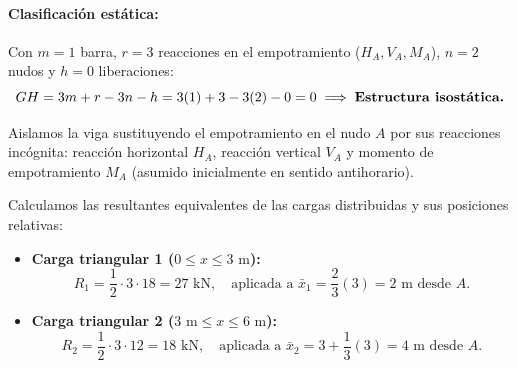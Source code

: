 \paragraph{Clasificación estática:}
Con $m = 1$ barra, $r = 3$ reacciones en el empotramiento ($H_A, V_A, M_A$), $n = 2$ nudos y $h = 0$ liberaciones:
\begin{equation}
    GH = 3m + r - 3n - h = 3(1) + 3 - 3(2) - 0 = 0 \implies \text{\textbf{Estructura isostática.}}
\end{equation}


Aislamos la viga sustituyendo el empotramiento en el nudo $A$ por sus reacciones incógnita: reacción horizontal $H_A$, reacción vertical $V_A$ y momento de empotramiento $M_A$ (asumido inicialmente en sentido antihorario).

Calculamos las resultantes equivalentes de las cargas distribuidas y sus posiciones relativas:
\begin{itemize}
    \item \textbf{Carga triangular 1 ($0 \le x \le 3\text{ m}$):}
          \begin{equation}
              R_1 = \frac{1}{2} \cdot 3 \cdot 18 = 27\text{ kN}, \quad \text{aplicada a } \bar{x}_1 = \frac{2}{3}(3) = 2\text{ m desde } A.
          \end{equation}
    \item \textbf{Carga triangular 2 ($3\text{ m} \le x \le 6\text{ m}$):}
          \begin{equation}
              R_2 = \frac{1}{2} \cdot 3 \cdot 12 = 18\text{ kN}, \quad \text{aplicada a } \bar{x}_2 = 3 + \frac{1}{3}(3) = 4\text{ m desde } A.
          \end{equation}
\end{itemize}

